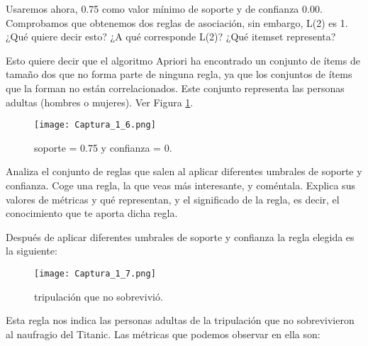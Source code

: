 \documentclass[11pt]{exam}
\begin{document}
\begin{questions}
{\question Usaremos ahora, 0.75 como valor mínimo de soporte y de confianza 0.00. Comprobamos que obtenemos dos reglas de asociación, sin embargo, L(2) es 1. ¿Qué quiere decir esto? ¿A qué corresponde L(2)? ¿Qué itemset representa?}

Esto quiere decir que el algoritmo Apriori ha encontrado un conjunto de ítems de tamaño dos que no forma parte de ninguna regla, ya que los conjuntos de ítems que la forman no están correlacionados. Este conjunto representa las personas adultas (hombres o mujeres). Ver Figura \ref{Captura_1_6}.

\begin{figure}[h]
	\centering
	\texttt{[image: Captura\_1\_6.png]}
	\caption{soporte = 0.75 y confianza = 0.}
	\label{Captura_1_6}
\end{figure}

\newpage
{\question Analiza el conjunto de reglas que salen al aplicar diferentes umbrales de soporte y confianza. Coge una regla, la que veas más interesante, y coméntala. Explica sus valores de métricas y qué representan, y el significado de la regla, es decir, el conocimiento que te aporta dicha regla.}

Después de aplicar diferentes umbrales de soporte y confianza la regla elegida es la siguiente:

\begin{figure}[h]
	\centering
	\texttt{[image: Captura\_1\_7.png]}
	\caption{tripulación que no sobrevivió.}
	\label{Captura_1_7}
\end{figure}

Esta regla nos indica las personas adultas de la tripulación que no sobrevivieron al naufragio del Titanic. Las métricas que podemos observar en ella son:


\end{questions}
\end{document}
